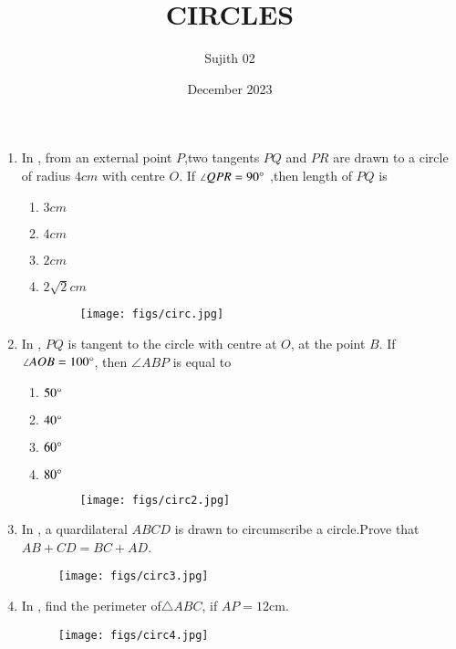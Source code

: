 \documentclass[12pt,-letter paper]{article}
\title{CIRCLES}
\author{Sujith 02}
\date{December 2023}
\begin{document}
\maketitle
\begin{enumerate}
\item In , from an external point $P$,two tangents $PQ$ and $PR$ are drawn to a circle of radius $4cm$ with centre $O$. If $\angle QPR=90\degree$ ,then length of $PQ$ is 
\begin{enumerate}[label=(\Alph*)]
\item $3cm$
\item $4cm$
\item $2cm$
\item $2\sqrt{2}cm$
\begin{figure}[H]
\centering
\texttt{[image: figs/circ.jpg]}
\caption{}
\label{fig:circ.jpg}
\end{figure}
\end{enumerate}
\item In , $PQ$ is tangent to the circle with centre at $O$, at the point $B$. If $\angle AOB=100\degree$, then $\angle ABP$ is equal to
\begin{enumerate}[label=(\Alph*)]
\item $50\degree$
\item $40\degree$
\item $60\degree$
\item $80\degree$
\begin{figure}[H]
\centering                                       
\texttt{[image: figs/circ2.jpg]}  
\caption{}
\label{fig:circ2.jpg}                      
\end{figure}
\end{enumerate}
\item In , a quardilateral $ABCD$ is drawn to circumscribe a circle.\newline Prove that \newline $AB+CD=BC+AD$.
\begin{figure}[H]
\centering
\texttt{[image: figs/circ3.jpg]}
\caption{}
\label{fig:circ3.pjpg}
\end{figure}
\item In , find the perimeter of$\triangle{ABC}$, if $AP=12$cm.
\begin{figure}[H]
\centering
\texttt{[image: figs/circ4.jpg]}
\caption{}
\label{fig:circ4.jpg}
\end{figure}
\end{enumerate}
\end{document}
